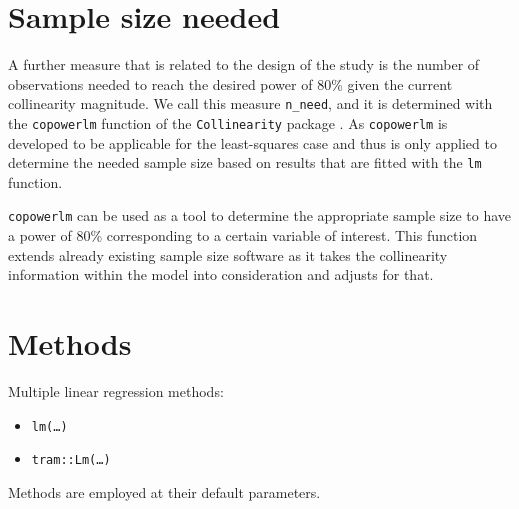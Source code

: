 \documentclass[11pt,a4paper,twoside]{book}\usepackage[]{graphicx}\usepackage[]{xcolor}
\begin{document}
\section{Sample size needed}

A further measure that is related to the design of the study is the number of observations needed to reach the desired power of 80\% given the current collinearity magnitude.
We call this measure \texttt{n\_need}, and it is determined with the \texttt{copowerlm} function of the \texttt{Collinearity} package \citep{Collinearity}. 
As \texttt{copowerlm} is developed to be applicable for the least-squares case and thus is only applied to determine the needed sample size based on results that are fitted with the \texttt{lm} function.

\texttt{copowerlm} can be used as a tool to  determine the appropriate sample size to have a power of 80\% corresponding to a certain variable of interest.
This function extends already existing sample size software as it takes the collinearity information within the model into consideration and adjusts for that.

\section{Methods}
Multiple linear regression methods:
\begin{itemize}
\item \texttt{lm(\dots)}
\item \texttt{tram::Lm(\dots)}
\end{itemize}
Methods are employed at their default parameters.

\end{document}
